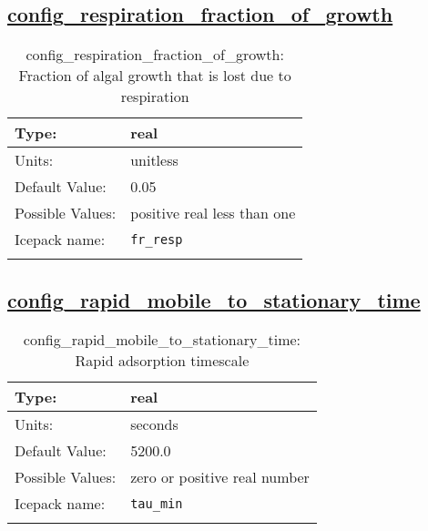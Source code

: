 \subsection[config\_respiration\_fraction\_of\_growth]{\hyperref[sec:nm_tab_biogeochemistry]{config\_respiration\_fraction\_of\_growth}}
\label{subsec:nm_sec_config_respiration_fraction_of_growth}
\begin{center}
\begin{longtable}{| p{2.0in} || p{4.0in} |}
    \hline
    Type: & real \\
    \hline
    Units: & \si{unitless} \\
    \hline
    Default Value: & 0.05 \\
    \hline
    Possible Values: & positive real less than one \\
    \hline
    Icepack name: & \verb+fr_resp+ \\
    \hline
    \caption{config\_respiration\_fraction\_of\_growth: Fraction of algal growth that is lost due to respiration}
\end{longtable}
\end{center}
\subsection[config\_rapid\_mobile\_to\_stationary\_time]{\hyperref[sec:nm_tab_biogeochemistry]{config\_rapid\_mobile\_to\_stationary\_time}}
\label{subsec:nm_sec_config_rapid_mobile_to_stationary_time}
\begin{center}
\begin{longtable}{| p{2.0in} || p{4.0in} |}
    \hline
    Type: & real \\
    \hline
    Units: & \si{seconds} \\
    \hline
    Default Value: & 5200.0 \\
    \hline
    Possible Values: & zero or positive real number \\
    \hline
    Icepack name: & \verb+tau_min+ \\
    \hline
    \caption{config\_rapid\_mobile\_to\_stationary\_time: Rapid adsorption timescale  }
\end{longtable}
\end{center}
